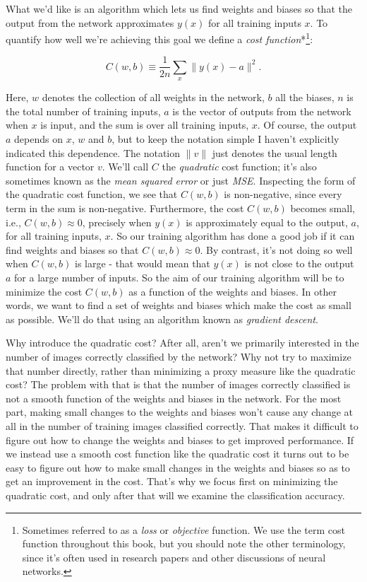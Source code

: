 What we'd like is an algorithm which lets us find weights and biases so that the output from the network approximates $y(x)$ for all training inputs $x$. To quantify how well we're achieving this goal we define a \emph{cost function}*\footnote{Sometimes referred to as a \emph{loss} or \emph{objective} function. We use the term cost function throughout this book, but you should note the other terminology, since it's often used in research papers and other discussions of neural networks.}:

\begin{equation}
C(w,b) \equiv \frac{1}{2n} \sum_x \| y(x) - a\|^2.
\tag{6}
\end{equation}

\noindent Here, $w$ denotes the collection of all weights in the network, $b$ all the biases, $n$ is the total number of training inputs, $a$ is the vector of outputs from the network when $x$ is input, and the sum is over all training inputs, $x$. Of course, the output $a$ depends on $x$, $w$ and $b$, but to keep the notation simple I haven't explicitly indicated this dependence. The notation $\| v \|$ just denotes the usual length function for a vector $v$. We'll call $C$ the \emph{quadratic} cost function; it's also sometimes known as the \emph{mean squared error} or just \emph{MSE}. Inspecting the form of the quadratic cost function, we see that $C(w,b)$ is non-negative, since every term in the sum is non-negative. Furthermore, the cost $C(w,b)$ becomes small, i.e., $C(w,b) \approx 0$, precisely when $y(x)$ is approximately equal to the output, $a$, for all training inputs, $x$. So our training algorithm has done a good job if it can find weights and biases so that $C(w,b) \approx 0$. By contrast, it's not doing so well when $C(w,b)$ is large - that would mean that $y(x)$ is not close to the output $a$ for a large number of inputs. So the aim of our training algorithm will be to minimize the cost $C(w,b)$ as a function of the weights and biases. In other words, we want to find a set of weights and biases which make the cost as small as possible. We'll do that using an algorithm known as \emph{gradient descent}.


Why introduce the quadratic cost? After all, aren't we primarily interested in the number of images correctly classified by the network? Why not try to maximize that number directly, rather than minimizing a proxy measure like the quadratic cost? The problem with that is that the number of images correctly classified is not a smooth function of the weights and biases in the network. For the most part, making small changes to the weights and biases won't cause any change at all in the number of training images classified correctly. That makes it difficult to figure out how to change the weights and biases to get improved performance. If we instead use a smooth cost function like the quadratic cost it turns out to be easy to figure out how to make small changes in the weights and biases so as to get an improvement in the cost. That's why we focus first on minimizing the quadratic cost, and only after that will we examine the classification accuracy.


